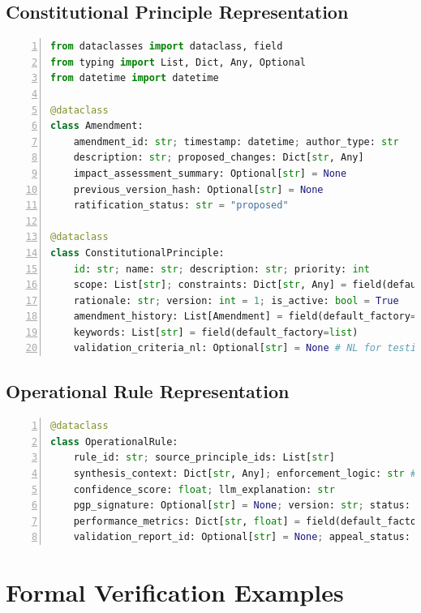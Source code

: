 \documentclass[sigconf,natbib]{acmart}
\begin{document}
\subsection{Constitutional Principle Representation}
\begin{lstlisting}[language=Python, caption=Python dataclass for ConstitutionalPrinciple., label=lst:constitutional_principle_dc, numbers=left, basicstyle=\ttfamily\scriptsize]
from dataclasses import dataclass, field
from typing import List, Dict, Any, Optional
from datetime import datetime

@dataclass
class Amendment:
    amendment_id: str; timestamp: datetime; author_type: str
    description: str; proposed_changes: Dict[str, Any]
    impact_assessment_summary: Optional[str] = None
    previous_version_hash: Optional[str] = None
    ratification_status: str = "proposed"

@dataclass
class ConstitutionalPrinciple:
    id: str; name: str; description: str; priority: int
    scope: List[str]; constraints: Dict[str, Any] = field(default_factory=dict)
    rationale: str; version: int = 1; is_active: bool = True
    amendment_history: List[Amendment] = field(default_factory=list)
    keywords: List[str] = field(default_factory=list)
    validation_criteria_nl: Optional[str] = None # NL for testing
\end{lstlisting}

\subsection{Operational Rule Representation}
\begin{lstlisting}[language=Python, caption=Python dataclass for OperationalRule., label=lst:operational_rule_dc, numbers=left, basicstyle=\ttfamily\scriptsize]
@dataclass
class OperationalRule:
    rule_id: str; source_principle_ids: List[str]
    synthesis_context: Dict[str, Any]; enforcement_logic: str # Rego code
    confidence_score: float; llm_explanation: str
    pgp_signature: Optional[str] = None; version: str; status: str = "generated"
    performance_metrics: Dict[str, float] = field(default_factory=dict)
    validation_report_id: Optional[str] = None; appeal_status: Optional[str] = None
\end{lstlisting}

\section{Formal Verification Examples}
\label{app:formal_verification}
\end{document}
